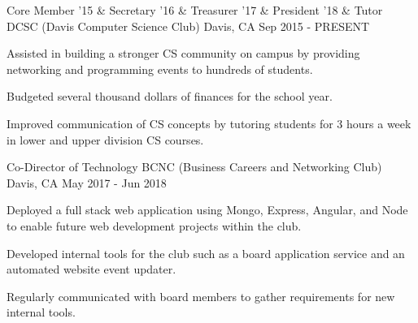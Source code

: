 

\begin{cventries}

  \cventry
  {Core Member '15 \& Secretary '16 \& Treasurer '17 \& President '18 \& Tutor} %
  {DCSC (Davis Computer Science Club)} %
  {Davis, CA} %
  {Sep 2015 - PRESENT} %
  {
    \begin{cvitems} %
      \item {Assisted in building a stronger CS community on campus by providing networking and programming events to hundreds of students.}
      \item {Budgeted several thousand dollars of finances for the school year.}
      \item {Improved communication of CS concepts by tutoring students for 3 hours a week in lower and upper division CS courses.}
    \end{cvitems}
  }

  \cventry
  {Co-Director of Technology} %
  {BCNC (Business Careers and Networking Club)} %
  {Davis, CA} %
  {May 2017 - Jun 2018} %
  {
    \begin{cvitems} %
      \item {Deployed a full stack web application using Mongo, Express, Angular, and Node to enable future web development projects within the club.}
      \item {Developed internal tools for the club such as a board application service and an automated website event updater.}
      \item {Regularly communicated with board members to gather requirements for new internal tools.}
    \end{cvitems}
  }
\end{cventries}
